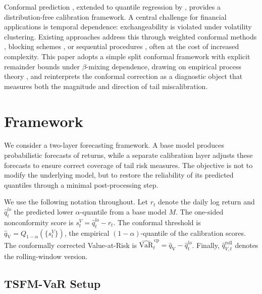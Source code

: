 \documentclass[preprint,11pt,authoryear]{elsarticle}
\newcommand{\VaR}{\mathrm{VaR}}
\newcommand{\1}{\boldsymbol{1}}
\newcommand{\qV}{\hat{q}_{\scriptscriptstyle\mathrm{V}}}
\begin{document}
	Conformal prediction \citep{vovk2005algorithmic}, extended to
	quantile regression by \citet{romano2019conformalized},
	provides a distribution-free calibration framework. A central
	challenge for financial applications is temporal dependence:
	exchangeability is violated under volatility clustering.
	Existing approaches address this through weighted conformal
	methods \citep{barber2023conformal}, blocking schemes
	\citep{chernozhukov2018exact}, or sequential procedures
	\citep{gibbs2021adaptive, zaffran2022conformal,
		xu2024conformal}, often at the cost of increased complexity.
	This paper adopts a simple split conformal framework with
	explicit remainder bounds under $\beta$-mixing dependence,
	drawing on empirical process theory
	\citep{rio2017asymptotic, yu1994rates}, and reinterprets the
	conformal correction as a diagnostic object that measures both
	the magnitude and direction of tail miscalibration.
	
	\section{Framework}
	\label{sec:framework}
	
	We consider a two-layer forecasting framework. A base model
	produces probabilistic forecasts of returns, while a separate
	calibration layer adjusts these forecasts to ensure correct
	coverage of tail risk measures. The objective is not to modify
	the underlying model, but to restore the reliability of its
	predicted quantiles through a minimal post-processing step.
	
	We use the following notation throughout. Let $r_t$ denote the
	daily log return and $\hat{q}_t^{lo}$ the predicted lower
	$\alpha$-quantile from a base model $M$. The one-sided
	nonconformity score is $s_t^{V} = \hat{q}_t^{lo} - r_t$. The
	conformal threshold is
	$\qV = Q_{1-\alpha}(\{s_t^{V}\})$, the empirical
	$(1-\alpha)$-quantile of the calibration scores. The
	conformally corrected Value-at-Risk is
	$\widehat{\VaR}_t^{\,\mathrm{cp}} = \qV - \hat{q}_t^{lo}$.
	Finally, $\hat{q}_{V,t}^{\mathrm{roll}}$ denotes the
	rolling-window version.
	
	\subsection{TSFM-VaR Setup}
	\label{sec:setup}
	
\end{document}
